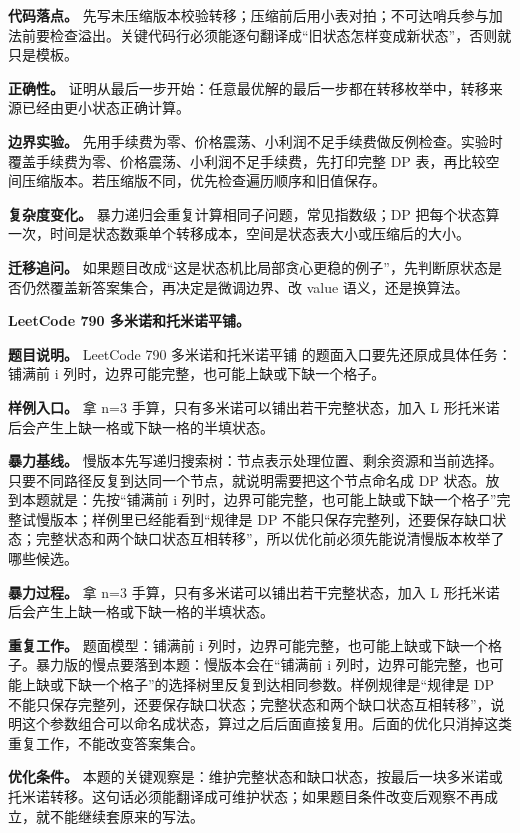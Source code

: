 \textbf{代码落点。} 先写未压缩版本校验转移；压缩前后用小表对拍；不可达哨兵参与加法前要检查溢出。关键代码行必须能逐句翻译成“旧状态怎样变成新状态”，否则就只是模板。

\textbf{正确性。} 证明从最后一步开始：任意最优解的最后一步都在转移枚举中，转移来源已经由更小状态正确计算。

\textbf{边界实验。} 先用手续费为零、价格震荡、小利润不足手续费做反例检查。实验时覆盖手续费为零、价格震荡、小利润不足手续费，先打印完整 DP 表，再比较空间压缩版本。若压缩版不同，优先检查遍历顺序和旧值保存。

\textbf{复杂度变化。} 暴力递归会重复计算相同子问题，常见指数级；DP 把每个状态算一次，时间是状态数乘单个转移成本，空间是状态表大小或压缩后的大小。

\textbf{迁移追问。} 如果题目改成“这是状态机比局部贪心更稳的例子”，先判断原状态是否仍然覆盖新答案集合，再决定是微调边界、改 value 语义，还是换算法。

\noindent\textbf{LeetCode 790 多米诺和托米诺平铺。}

\textbf{题目说明。} LeetCode 790 多米诺和托米诺平铺 的题面入口要先还原成具体任务：铺满前 i 列时，边界可能完整，也可能上缺或下缺一个格子。

\textbf{样例入口。} 拿 n=3 手算，只有多米诺可以铺出若干完整状态，加入 L 形托米诺后会产生上缺一格或下缺一格的半填状态。

\textbf{暴力基线。} 慢版本先写递归搜索树：节点表示处理位置、剩余资源和当前选择。只要不同路径反复到达同一个节点，就说明需要把这个节点命名成 DP 状态。放到本题就是：先按“铺满前 i 列时，边界可能完整，也可能上缺或下缺一个格子”完整试慢版本；样例里已经能看到“规律是 DP 不能只保存完整列，还要保存缺口状态；完整状态和两个缺口状态互相转移”，所以优化前必须先能说清慢版本枚举了哪些候选。

\textbf{暴力过程。} 拿 n=3 手算，只有多米诺可以铺出若干完整状态，加入 L 形托米诺后会产生上缺一格或下缺一格的半填状态。

\textbf{重复工作。} 题面模型：铺满前 i 列时，边界可能完整，也可能上缺或下缺一个格子。暴力版的慢点要落到本题：慢版本会在“铺满前 i 列时，边界可能完整，也可能上缺或下缺一个格子”的选择树里反复到达相同参数。样例规律是“规律是 DP 不能只保存完整列，还要保存缺口状态；完整状态和两个缺口状态互相转移”，说明这个参数组合可以命名成状态，算过之后后面直接复用。后面的优化只消掉这类重复工作，不能改变答案集合。

\textbf{优化条件。} 本题的关键观察是：维护完整状态和缺口状态，按最后一块多米诺或托米诺转移。这句话必须能翻译成可维护状态；如果题目条件改变后观察不再成立，就不能继续套原来的写法。

